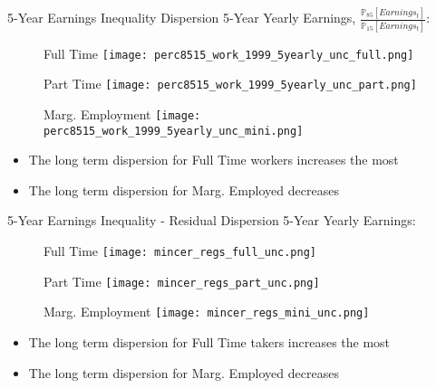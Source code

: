 \documentclass[hyperref={bookmarks=false}]{beamer}
\begin{document}
\begin{appendix}
\begin{frame}{5-Year Earnings Inequality}
Dispersion 5-Year Yearly Earnings, $\frac{\mathbb{P}_{85}[Earnings_t]}{\mathbb{P}_{15}[Earnings_t]}$:
\begin{figure}[!t]
\begin{minipage}[b]{0.32\textwidth}{Full Time}
\centering
\texttt{[image: perc8515\_work\_1999\_5yearly\_unc\_full.png]}
\end{minipage}
\begin{minipage}[b]{0.32\textwidth}{Part Time}
\centering
\texttt{[image: perc8515\_work\_1999\_5yearly\_unc\_part.png]}
\end{minipage}
\begin{minipage}[b]{0.32\textwidth}{Marg. Employment}
\centering
\texttt{[image: perc8515\_work\_1999\_5yearly\_unc\_mini.png]}
\end{minipage}
\end{figure}
\begin{itemize}
\item The long term dispersion for Full Time workers increases the most
\item The long term dispersion for Marg. Employed decreases
\end{itemize}
\end{frame}

\begin{frame}{5-Year Earnings Inequality - Residual}
Dispersion 5-Year Yearly Earnings:
\begin{figure}[!t]
\begin{minipage}[b]{0.32\textwidth}{Full Time}
\centering
\texttt{[image: mincer\_regs\_full\_unc.png]}
\end{minipage}
\begin{minipage}[b]{0.32\textwidth}{Part Time}
\centering
\texttt{[image: mincer\_regs\_part\_unc.png]}
\end{minipage}
\begin{minipage}[b]{0.32\textwidth}{Marg. Employment}
\centering
\texttt{[image: mincer\_regs\_mini\_unc.png]}
\end{minipage}
\end{figure}
\begin{itemize}
\item The long term dispersion for Full Time takers increases the most
\item The long term dispersion for Marg. Employed decreases
\end{itemize}
\end{frame}



\end{appendix}
\end{document}
